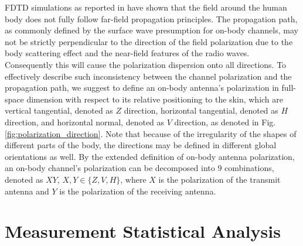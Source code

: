 \documentclass[conference]{IEEEtran}
\begin{document}
FDTD simulations as reported in \cite{} have shown that the field around the human body does not fully follow far-field propagation principles. The propagation path, as commonly defined by the surface wave presumption for on-body channels, may not be strictly perpendicular to the direction of the field polarization due to the body scattering effect and the near-field features of the radio waves. Consequently this will cause the polarization dispersion onto all directions. To effectively describe such inconsistency between the channel polarization and the propagation path, we suggest to define an on-body antenna's polarization in full-space dimension with respect to its relative positioning to the skin, which are vertical tangential, denoted as $Z$ direction, horizontal tangential, denoted as $H$ direction, and horizontal normal, denoted as $V$ direction, as denoted in Fig. \ref{fig:polarization_direction}. Note that because of the irregularity of the shapes of different parts of the body, the directions may be defined in different global orientations as well. By the extended definition of on-body antenna polarization, an on-body channel's polarization can be decomposed into 9 combinations, denoted as $XY$, $X, Y \in \{Z,V,H\}$, where $X$ is the polarization of the transmit antenna and $Y$ is the polarization of the receiving antenna.

\section{Measurement Statistical Analysis}\label{sec:analysis}

\begin{table}[!t]
\centering
\captionsetup{labelsep=newline}
\caption{Path Loss Summary of Measurements [dB]}
\label{tab:2}
\end{table}
\end{document}

